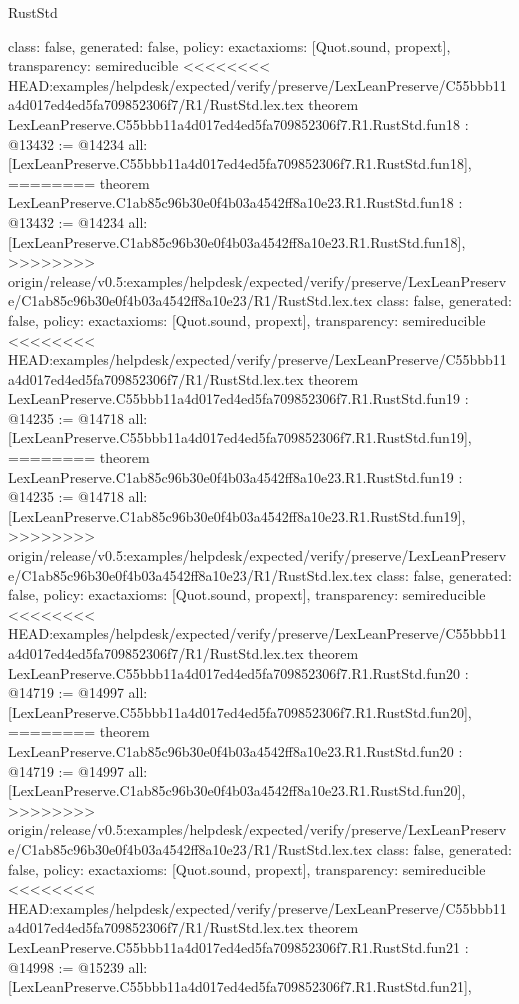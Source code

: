 \begin{lexlean}{RustStd}
\begin{coremodule}
{\begin{coremodule}
{{{{{{{{{{{{{{{{{{{{{  class: false,
  generated: false,
  policy: exact{axioms: [Quot.sound, propext]},
  transparency: semireducible
}
<<<<<<<< HEAD:examples/helpdesk/expected/verify/preserve/LexLeanPreserve/C55bbb11a4d017ed4ed5fa709852306f7/R1/RustStd.lex.tex
theorem LexLeanPreserve.C55bbb11a4d017ed4ed5fa709852306f7.R1.RustStd.fun18 : @13432 := @14234 {
  all: [LexLeanPreserve.C55bbb11a4d017ed4ed5fa709852306f7.R1.RustStd.fun18],
========
theorem LexLeanPreserve.C1ab85c96b30e0f4b03a4542ff8a10e23.R1.RustStd.fun18 : @13432 := @14234 {
  all: [LexLeanPreserve.C1ab85c96b30e0f4b03a4542ff8a10e23.R1.RustStd.fun18],
>>>>>>>> origin/release/v0.5:examples/helpdesk/expected/verify/preserve/LexLeanPreserve/C1ab85c96b30e0f4b03a4542ff8a10e23/R1/RustStd.lex.tex
  class: false,
  generated: false,
  policy: exact{axioms: [Quot.sound, propext]},
  transparency: semireducible
}
<<<<<<<< HEAD:examples/helpdesk/expected/verify/preserve/LexLeanPreserve/C55bbb11a4d017ed4ed5fa709852306f7/R1/RustStd.lex.tex
theorem LexLeanPreserve.C55bbb11a4d017ed4ed5fa709852306f7.R1.RustStd.fun19 : @14235 := @14718 {
  all: [LexLeanPreserve.C55bbb11a4d017ed4ed5fa709852306f7.R1.RustStd.fun19],
========
theorem LexLeanPreserve.C1ab85c96b30e0f4b03a4542ff8a10e23.R1.RustStd.fun19 : @14235 := @14718 {
  all: [LexLeanPreserve.C1ab85c96b30e0f4b03a4542ff8a10e23.R1.RustStd.fun19],
>>>>>>>> origin/release/v0.5:examples/helpdesk/expected/verify/preserve/LexLeanPreserve/C1ab85c96b30e0f4b03a4542ff8a10e23/R1/RustStd.lex.tex
  class: false,
  generated: false,
  policy: exact{axioms: [Quot.sound, propext]},
  transparency: semireducible
}
<<<<<<<< HEAD:examples/helpdesk/expected/verify/preserve/LexLeanPreserve/C55bbb11a4d017ed4ed5fa709852306f7/R1/RustStd.lex.tex
theorem LexLeanPreserve.C55bbb11a4d017ed4ed5fa709852306f7.R1.RustStd.fun20 : @14719 := @14997 {
  all: [LexLeanPreserve.C55bbb11a4d017ed4ed5fa709852306f7.R1.RustStd.fun20],
========
theorem LexLeanPreserve.C1ab85c96b30e0f4b03a4542ff8a10e23.R1.RustStd.fun20 : @14719 := @14997 {
  all: [LexLeanPreserve.C1ab85c96b30e0f4b03a4542ff8a10e23.R1.RustStd.fun20],
>>>>>>>> origin/release/v0.5:examples/helpdesk/expected/verify/preserve/LexLeanPreserve/C1ab85c96b30e0f4b03a4542ff8a10e23/R1/RustStd.lex.tex
  class: false,
  generated: false,
  policy: exact{axioms: [Quot.sound, propext]},
  transparency: semireducible
}
<<<<<<<< HEAD:examples/helpdesk/expected/verify/preserve/LexLeanPreserve/C55bbb11a4d017ed4ed5fa709852306f7/R1/RustStd.lex.tex
theorem LexLeanPreserve.C55bbb11a4d017ed4ed5fa709852306f7.R1.RustStd.fun21 : @14998 := @15239 {
  all: [LexLeanPreserve.C55bbb11a4d017ed4ed5fa709852306f7.R1.RustStd.fun21],
}}}}}}}}}}}}}}}}}}}}}}}}
\end{coremodule}}
\end{coremodule}
\end{lexlean}
